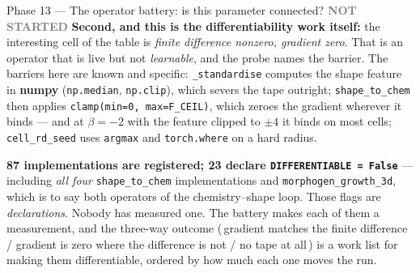 \documentclass[11pt,a4paper]{article}
\newcommand{\code}[1]{\texttt{#1}}
\newcommand{\todo}{\textcolor{grey}{\textbf{NOT STARTED}}}
\begin{document}
\begin{phasebox}{Phase 13 --- The operator battery: is this parameter connected? \hfill \todo}
\textbf{Second, and this is the differentiability work itself:} the interesting cell of the table is
\emph{finite difference nonzero, gradient zero}. That is an operator that is live but not
\emph{learnable}, and the probe names the barrier. The barriers here are known and specific:
\code{\_standardise} computes the shape feature in \textbf{numpy} (\code{np.median},
\code{np.clip}), which severs the tape outright; \code{shape\_to\_chem} then applies
\code{clamp(min=0, max=F\_CEIL)}, which zeroes the gradient wherever it binds --- and at $\beta=-2$
with the feature clipped to $\pm4$ it binds on most cells; \code{cell\_rd\_seed} uses
\code{argmax} and \code{torch.where} on a hard radius.

\textbf{87 implementations are registered; 23 declare \code{DIFFERENTIABLE = False}} --- including
\emph{all four} \code{shape\_to\_chem} implementations and \code{morphogen\_growth\_3d}, which is to
say both operators of the chemistry--shape loop. Those flags are \emph{declarations}. Nobody has
measured one. The battery makes each of them a measurement, and the three-way outcome
(\,gradient matches the finite difference / gradient is zero where the difference is not / no tape at
all\,) is a work list for making them differentiable, ordered by how much each one moves the run.


\end{phasebox}
\end{document}

